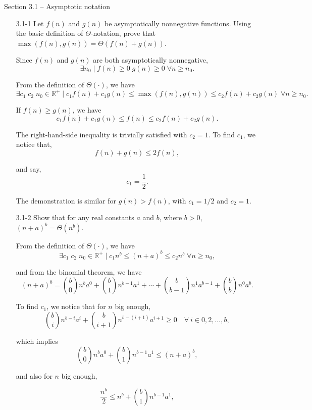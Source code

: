 \documentclass{report}
\makeatletter
\renewenvironment{framed}{%
 \def\FrameCommand##1{\hskip\@totalleftmargin
 \fboxsep=\FrameSep\fbox{##1}}%
 \MakeFramed {\advance\hsize-\width
   \@totalleftmargin\z@ \linewidth\hsize
   \@setminipage}}%
 {\par\unskip\endMakeFramed}
\DeclareMathOperator{\Exists}{\exists}
\DeclareMathOperator{\Forall}{\forall}
\makeatother
\begin{document}
\small

{\large Section 3.1 {--} Asymptotic notation}

\begin{enumerate}

\item[3.1{-}1]{Let $f(n)$ and $g(n)$ be asymptotically nonnegative functions.
  Using the basic definition of $\Theta$-notation, prove that
  $\max(f(n), g(n)) = \Theta(f(n) + g(n))$.}

\begin{framed}
Since $f(n)$ and $g(n)$ are both asymptotically nonnegative,
\[
\Exists n_0 \mid f(n) \ge 0\;g(n) \ge 0\;\Forall n \ge n_0.
\]

From the definition of $\Theta(\cdot)$, we have
\[
\Exists c_1\;c_2\;n_0\in\mathbb{R}^+ \mid
c_1 f(n) + c_1 g(n) \le \max(f(n), g(n)) \le c_2 f(n) + c_2 g(n)\;
\Forall n \ge n_0.
\]

If $f(n) \ge g(n)$, we have
\[
c_1 f(n) + c_1 g(n) \le f(n) \le c_2 f(n) + c_2 g(n).
\]


The right-hand-side inequality is trivially satisfied with $c_2 = 1$. To find
\(c_1\), we notice that,
\[
f(n) + g(n) \le 2f(n),
\]

and say,
\[
c_1 = \frac{1}{2}.
\]

The demonstration is similar for $g(n) > f(n)$, with $c_1 = 1/2$ and $c_2 = 1$.
\end{framed}

\item[3.1{-}2]{Show that for any real constants $a$ and $b$, where
$b > 0$, $(n + a)^b = \Theta(n^b)$.}

\begin{framed}
From the definition of \(\Theta(\cdot)\), we have
\[
\Exists c_1\;c_2\;n_0\in\mathbb{R}^+ \mid c_1 n^b \leq (n+a)^b \leq c_2 n^b\;
\Forall n \ge n_0,
\]

and from the binomial theorem, we have
\[
(n + a)^b = \binom{b}{0} n^b a^0 + \binom{b}{1} n^{b - 1} a^1 + \cdots +
            \binom{b}{b - 1} n^1 a^{b - 1} + \binom{b}{b} n^0 a^b.
\]

To find \(c_1\), we notice that for $n$ big enough,
\[
\binom{b}{i} n^{b - i} a^i + \binom{b}{i + 1} n^{b - (i + 1)} a^{i + 1} \ge 0
\quad \forall\ i \in 0, 2, \dots ,b,
\]

which implies
\[
\binom{b}{0} n^b a^0 + \binom{b}{1} n^{b - 1} a^1 \le (n + a)^b,
\]

and also for $n$ big enough,

\[
\frac{n^b}{2} \le n^b + \binom{b}{1} n^{b - 1} a^1,
\]


\end{framed}
\end{enumerate}
\end{document}
